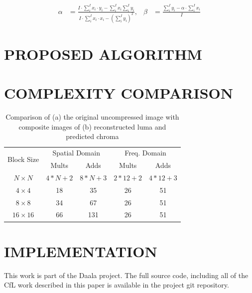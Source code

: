 \documentclass[a4paper]{spie}  %
\begin{document}
\begin{align*}
\alpha & = \frac{I\cdot\displaystyle\sum_i^I x_i\cdot y_i - \displaystyle\sum_i^I x_i\displaystyle\sum_i^I y_i}{I\cdot\displaystyle\sum_i^I x_i\cdot x_i - \left(\displaystyle\sum_i^I y_i\right)^2}, & \beta & = \frac{\displaystyle\sum_i^I y_i -\alpha\cdot\displaystyle\sum_i^I x_i}{I}
\end{align*}

\section{PROPOSED ALGORITHM}
\label{sec:alg}

\section{COMPLEXITY COMPARISON}

\begin{table}
\begin{center}
\begin{tabular}{|c|c|c|c|c|}
\hline
\multirow{2}{*}{Block Size} & \multicolumn{2}{|c|}{Spatial Domain} & \multicolumn{2}{|c|}{Freq. Domain} \\
\cline{2-5}
 & Mults & Adds & Mults & Adds \\
\hline
$N\times N$ & $4*N+2$ & $8*N+3$ & $2*12+2$ & $4*12+3$ \\
\hline
$4\times 4$ & 18 & 35 & 26 & 51 \\
\hline
$8\times 8$ & 34 & 67 & 26 & 51 \\
\hline
$16\times 16$\footnotemark[1] & 66 & 131 & 26 & 51 \\
\hline
\end{tabular}
\end{center}
\caption[example]{\label{fig:comp} Comparison of (a) the original uncompressed
 image with composite images of (b) reconstructed luma and predicted chroma}
\end{table}
\cite{valin2013high}

\section{IMPLEMENTATION}

This work is part of the Daala project\cite{DaalaWebsite}.
The full source code, including all of the CfL work described in this paper is
 available in the project git repository\cite{DaalaGit}.
\end{document}
